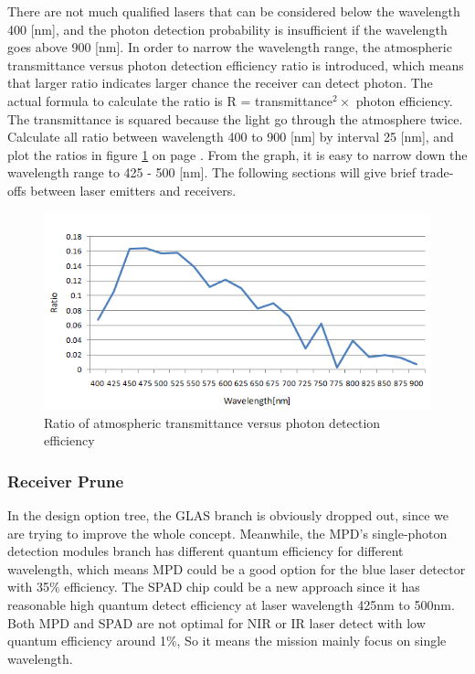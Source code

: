 There are not much qualified \acs{laser}s that can be considered below the wavelength 400 [nm], and the photon detection probability is insufficient if the wavelength goes above 900 [nm]. In order to narrow the wavelength range, the atmospheric transmittance versus photon detection efficiency ratio is introduced, which means that larger ratio indicates larger chance the receiver can detect photon. The actual formula to calculate the ratio is R = transmittance$^{2} \times$ photon efficiency. The transmittance is squared because the light go through the atmosphere twice. Calculate all ratio between wavelength 400 to 900 [nm] by interval 25 [nm], and plot the ratios in figure \ref{fig:wavelength_estimation} on page \pageref{fig:wavelength_estimation}. From the graph, it is easy to narrow down the wavelength range to 425 - 500 [nm].  The following sections will give brief trade-offs between \acs{laser} emitters and receivers.

\begin{figure}[ht!]
\centering
\includegraphics[scale=1]{chapters/img/wavelength_estimation.png}
\caption{Ratio of atmospheric transmittance versus photon detection efficiency}
\label{fig:wavelength_estimation}
\end{figure}

\subsubsection{Receiver Prune}
\label{TOReceiverP}
In the design option tree, the GLAS branch is obviously dropped out, since we are trying to improve the whole concept. Meanwhile, the \ac{MPD}'s single-photon detection modules branch has different quantum efficiency for different wavelength, which means MPD could be a good option for the blue laser detector with 35\% efficiency. The \ac{SPAD} chip could be a new approach since it has reasonable high quantum detect efficiency at laser wavelength 425nm to 500nm. Both \acs{MPD} and \acs{SPAD} are not optimal for \acs{NIR} or \acs{IR} laser detect with low quantum efficiency around 1\%, So it means the mission mainly focus on single wavelength.

